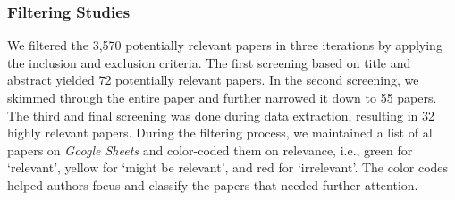 \subsubsection{Filtering Studies}
We filtered the 3,570 potentially relevant papers in three iterations by applying the inclusion and exclusion criteria. The first screening based on title and abstract yielded 72 potentially relevant papers. In the second screening, we skimmed through the entire paper and further narrowed it down to 55 papers. The third and final screening was done during data extraction, resulting in 32 highly relevant papers. During the filtering process, we maintained a list of all papers on \textit{Google Sheets} and color-coded them on relevance, i.e., green for `relevant', yellow for `might be relevant', and red for `irrelevant'. The color codes helped authors focus and classify the papers that needed further attention. 

